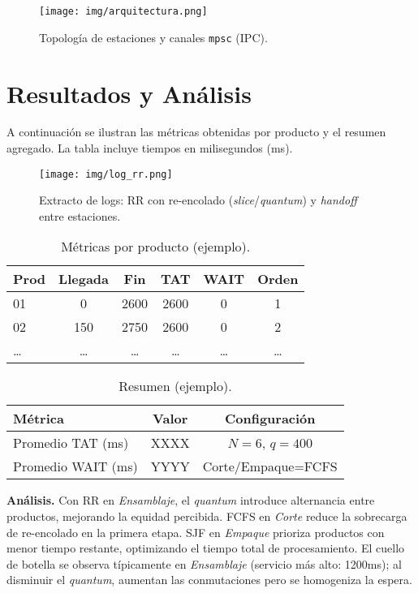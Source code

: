 \documentclass[conference]{IEEEtran}
\begin{document}
\begin{figure}[H]
    \centering
    \texttt{[image: img/arquitectura.png]}
    \caption{Topología de estaciones y canales \texttt{mpsc} (IPC).}
\end{figure}

\section{Resultados y Análisis}
A continuación se ilustran las métricas obtenidas por producto y el resumen agregado. La tabla incluye tiempos en milisegundos (ms).

\begin{figure}[H]
    \centering
    \texttt{[image: img/log\_rr.png]}
    \caption{Extracto de logs: RR con re-encolado (\textit{slice}/\textit{quantum}) y \textit{handoff} entre estaciones.}
\end{figure}

\begin{table}[H]
\centering
\caption{Métricas por producto (ejemplo).}
\begin{tabular}{lccccc}
\hline
Prod & Llegada & Fin & TAT & WAIT & Orden \\
\hline
01 & 0   & 2600 & 2600 & 0   & 1 \\
02 & 150 & 2750 & 2600 & 0   & 2 \\
\ldots & \ldots & \ldots & \ldots & \ldots & \ldots \\
\hline
\end{tabular}
\end{table}

\begin{table}[H]
\centering
\caption{Resumen (ejemplo).}
\begin{tabular}{lcc}
\hline
Métrica & Valor & Configuración \\
\hline
Promedio TAT (ms)  & XXXX & $N=6$, $q=400$ \\
Promedio WAIT (ms) & YYYY & Corte/Empaque=FCFS \\
\hline
\end{tabular}
\end{table}

\noindent\textbf{Análisis.} Con RR en \textit{Ensamblaje}, el \textit{quantum} introduce alternancia entre productos, mejorando la equidad percibida. FCFS en \textit{Corte} reduce la sobrecarga de re-encolado en la primera etapa. SJF en \textit{Empaque} prioriza productos con menor tiempo restante, optimizando el tiempo total de procesamiento. El cuello de botella se observa típicamente en \textit{Ensamblaje} (servicio más alto: 1200ms); al disminuir el \textit{quantum}, aumentan las conmutaciones pero se homogeniza la espera.
\end{document}
